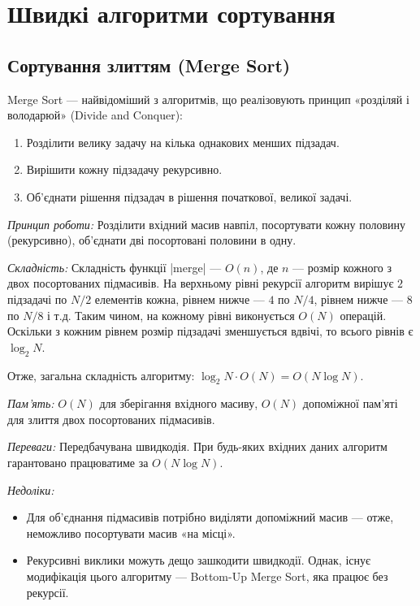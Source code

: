 \documentclass[12pt,a4paper]{report}
\begin{document}
\pagebreak



\section{Швидкі алгоритми сортування}


\subsection{Сортування злиттям (Merge Sort)}

Merge Sort --- найвідоміший з алгоритмів, що реалізовують принцип «розділяй і володарюй» (Divide and Conquer):
\begin{enumerate}
    \item Розділити велику задачу на кілька однакових менших підзадач.
    \item Вирішити кожну підзадачу рекурсивно.
    \item Об’єднати рішення підзадач в рішення початкової, великої задачі.
\end{enumerate}

\emph{Принцип роботи:} Розділити вхідний масив навпіл, посортувати кожну половину (рекурсивно), об’єднати дві посортовані половини в одну.



\emph{Складність:} Складність функції |merge| --- \(O(n)\), де \(n\) --- розмір кожного з двох посортованих підмасивів.
На верхньому рівні рекурсії алгоритм вирішує \(2\) підзадачі по \(N/2\) елементів кожна, рівнем нижче --- \(4\) по \(N/4\), рівнем нижче --- \(8\) по \(N/8\) і т.д.
Таким чином, на кожному рівні виконується \(O(N)\) операцій.
Оскільки з кожним рівнем розмір підзадачі зменшується вдвічі, то всього рівнів є \(\log_2 N\).

Отже, загальна складність алгоритму: \(\log_2 N \cdot O(N) = O(N \log N)\).

\emph{Пам’ять:} \(O(N)\) для зберігання вхідного масиву, \(O(N)\) допоміжної пам’яті для злиття двох посортованих підмасивів.

\emph{Переваги:} Передбачувана швидкодія. При будь-яких вхідних даних алгоритм гарантовано працюватиме за \(O(N \log N)\).

\emph{Недоліки:}
\begin{itemize}
    \item Для об’єднання підмасивів потрібно виділяти допоміжний масив --- отже, неможливо посортувати масив «на місці».
    \item Рекурсивні виклики можуть дещо зашкодити швидкодії. Однак, існує модифікація цього алгоритму --- Bottom-Up Merge Sort, яка працює без рекурсії.
\end{itemize}
\end{document}
